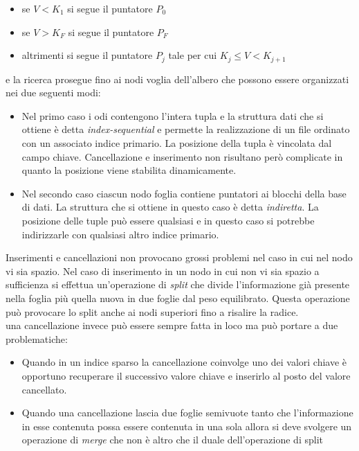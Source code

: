 \begin{itemize}
  \item se $V < K_1$ si segue il puntatore $P_0$
  \item se $V > K_F$ si segue il puntatore $P_F$
  \item altrimenti si segue il puntatore $P_j$ tale per cui $K_j \leq V <K_{j+1}$
\end{itemize}
e la ricerca prosegue fino ai nodi voglia dell'albero che possono essere organizzati nei due seguenti modi:
\begin{itemize}
  \item Nel primo caso i odi contengono l'intera tupla e la struttura dati che si ottiene è detta \emph{index-sequential} e permette la realizzazione di un file ordinato con un associato indice primario. La posizione della tupla è vincolata dal campo chiave. Cancellazione e inserimento non risultano però complicate in quanto la posizione viene stabilita dinamicamente.
  \item Nel secondo caso ciascun nodo foglia contiene puntatori ai blocchi della base di dati. La struttura che si ottiene in questo caso è detta \emph{indiretta}. La posizione delle tuple può essere qualsiasi e in questo caso si potrebbe indirizzarle con qualsiasi altro indice primario.
\end{itemize}
Inserimenti e cancellazioni non provocano grossi problemi nel caso in cui nel nodo vi sia spazio. Nel caso di inserimento in un nodo in cui non vi sia spazio a sufficienza si effettua un'operazione di \emph{split} che divide l'informazione già presente nella foglia più quella nuova in due foglie dal peso equilibrato. Questa operazione può provocare lo split anche ai nodi superiori fino a risalire la radice.\\
una cancellazione invece può essere sempre fatta in loco ma può portare a due problematiche:
\begin{itemize}
  \item Quando in un indice sparso la cancellazione coinvolge uno dei valori chiave è opportuno recuperare il successivo valore chiave e inserirlo al posto del valore cancellato.
  \item Quando una cancellazione lascia due foglie semivuote tanto che l'informazione in esse contenuta possa essere contenuta in una sola allora si deve svolgere un operazione di \emph{merge} che non è altro che il duale dell'operazione di split
\end{itemize}
